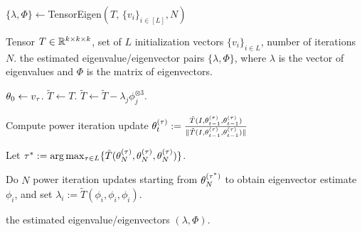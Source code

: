 \begin{algorithm}
\caption{$\{\lambda, \Phi\}\leftarrow $TensorEigen$(T,\, \{v_i\}_{i\in [L]}, N)$}\label{alg:robustpower}
\begin{algorithmic}
\renewcommand{\algorithmicrequire}{\textbf{Input: }}
\renewcommand{\algorithmicensure}{\textbf{Output: }}
\REQUIRE Tensor $T\in \mathbb{R}^{k \times k \times k}$, set of $L$ initialization vectors $\{v_i\}_{i\in L}$, number of
iterations  $N$.
\ENSURE the estimated eigenvalue/eigenvector pairs $\{\lambda, \Phi\}$, where $\lambda$ is the vector of eigenvalues and $\Phi$ is the matrix of eigenvectors.

\STATE $\theta_{0}\leftarrow v_\tau$.
\STATE $\tilde{T}\leftarrow T$.
\STATE $\tilde{T}\leftarrow \tilde{T}- \lambda_j \phi_j^{\otimes 3}$.
\ENDIF
\ENDFOR

\STATE Compute power iteration update
$
\theta_{t}^{(\tau)}  :=
\frac{\tilde{T}(I, \theta_{t-1}^{(\tau)}, \theta_{t-1}^{(\tau)})}
{\|\tilde{T}(I, \theta_{t-1}^{(\tau)}, \theta_{t-1}^{(\tau)})\|}
$\ENDFOR
\ENDFOR

\STATE Let $\tau^* := \arg\max_{\tau \in L} \{ \tilde{T}(\theta_{N}^{(\tau)},
\theta_{N}^{(\tau)}, \theta_{N}^{(\tau)}) \}$.

\STATE Do $N$ power iteration updates starting from
$\theta_{N}^{(\tau^*)}$ to obtain eigenvector estimate $\phi_i$, and set $\lambda_i :=
\tilde{T}(\phi_i, \phi_i, \phi_i)$.

\ENDFOR
\RETURN the estimated eigenvalue/eigenvectors
$(\lambda, \Phi)$.

\end{algorithmic}
\end{algorithm}
%
%
%
